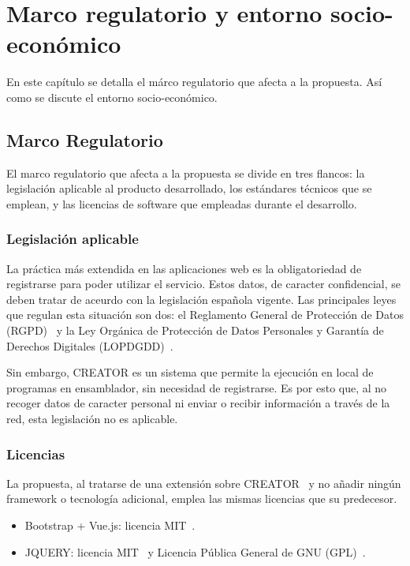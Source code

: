 \chapter{Marco regulatorio y entorno socio-económico}\label{chap:regulation}
En este capítulo se detalla el márco regulatorio que afecta a la propuesta. Así como se discute el entorno socio-económico.

\section{Marco Regulatorio}\label{sec:regulatory-framework}
El marco regulatorio que afecta a la propuesta se divide en tres flancos: la legislación aplicable al producto desarrollado, los estándares técnicos que se emplean, y las licencias de software que empleadas durante el desarrollo.

\subsection{Legislación aplicable}
La práctica más extendida en las aplicaciones web es la obligatoriedad de registrarse para poder utilizar el servicio. Estos datos, de caracter confidencial, se deben tratar de aceurdo con la legislación española vigente. Las principales leyes que regulan esta situación son dos: el Reglamento General de Protección de Datos (RGPD)~\cite{rgpd} y la Ley Orgánica de Protección de Datos Personales y Garantía de Derechos Digitales (LOPDGDD)~\cite{ley-de-datos}.

Sin embargo, CREATOR es un sistema que permite la ejecución en local de programas en ensamblador, sin necesidad de registrarse. Es por esto que, al no recoger datos de caracter personal ni enviar o recibir información a través de la red, esta legislación no es aplicable.

\subsection{Licencias}
La propuesta, al tratarse de una extensión sobre CREATOR~\cite{camarmas2024creator} y no añadir ningún framework o tecnología adicional, emplea las mismas licencias que su predecesor.

\begin{itemize}
    \item Bootstrap + Vue.js: licencia MIT~\cite{MIT-license}.
    \item JQUERY: licencia MIT~\cite{MIT-license} y Licencia Pública General de GNU (GPL)~\cite{gnu-license}.
\end{itemize}

